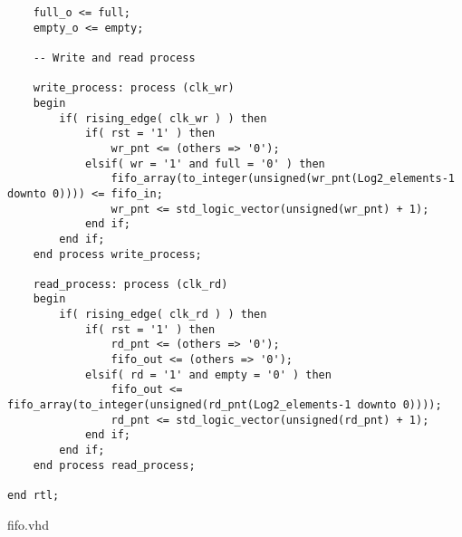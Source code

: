 \begin{code}
\begin{verbatim}
    full_o <= full;
    empty_o <= empty;

    -- Write and read process

    write_process: process (clk_wr)
    begin
        if( rising_edge( clk_wr ) ) then
            if( rst = '1' ) then
                wr_pnt <= (others => '0');
            elsif( wr = '1' and full = '0' ) then
                fifo_array(to_integer(unsigned(wr_pnt(Log2_elements-1 downto 0)))) <= fifo_in;
                wr_pnt <= std_logic_vector(unsigned(wr_pnt) + 1);
            end if;                 
        end if;
    end process write_process;

    read_process: process (clk_rd)
    begin
        if( rising_edge( clk_rd ) ) then
            if( rst = '1' ) then
                rd_pnt <= (others => '0');
                fifo_out <= (others => '0');
            elsif( rd = '1' and empty = '0' ) then
                fifo_out <= fifo_array(to_integer(unsigned(rd_pnt(Log2_elements-1 downto 0))));
                rd_pnt <= std_logic_vector(unsigned(rd_pnt) + 1);
            end if;                 
        end if;
    end process read_process;

end rtl;
\end{verbatim}
\caption{fifo.vhd}
\label{ap-cod:2}
\end{code}

